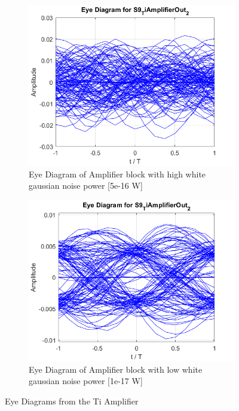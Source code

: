 \begin{figure}[H]
	\centering
        \begin{subfigure}{.45\textwidth}
        \centering
        	\includegraphics[width=.9\textwidth]{./lib/m_qam_receiver/figures/Amp5e-16.png}
        	\caption{Eye Diagram of Amplifier block \newline with high white gaussian noise power [5e-16 W]}\label{EyeDiagramAmp_a}
        \end{subfigure}%
        \begin{subfigure}{.45\textwidth}
        \centering
        	\includegraphics[width=.9\textwidth]{./lib/m_qam_receiver/figures/Amp1e-17.png}
        	\caption{Eye Diagram of Amplifier block \newline with low white gaussian noise power [1e-17 W]}\label{EyeDiagramAmp_b}
        \end{subfigure}
        \caption{Eye Diagrams from the Ti Amplifier}\label{EyeDiagramAmp}
\end{figure}

